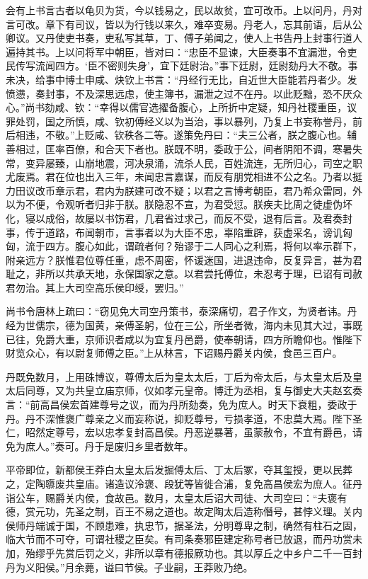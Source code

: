 \documentclass[12pt,UTF8]{ctexbook}
\begin{document}
会有上书言古者以龟贝为货，今以钱易之，民以故贫，宜可改币。上以问丹，丹对言可改。章下有司议，皆以为行钱以来久，难卒变易。丹老人，忘其前语，后从公卿议。又丹使吏书奏，吏私写其草，丁、傅子弟闻之，使人上书告丹上封事行道人遍持其书。上以问将军中朝臣，皆对曰：“忠臣不显谏，大臣奏事不宜漏泄，令吏民传写流闻四方。‘臣不密则失身’，宜下廷尉治。”事下廷尉，廷尉劾丹大不敬。事未决，给事中博士申咸、炔钦上书言：“丹经行无比，自近世大臣能若丹者少。发愤懑，奏封事，不及深思远虑，使主簿书，漏泄之过不在丹。以此贬黜，恐不厌众心。”尚书劾咸、钦：“幸得以儒官选擢备腹心，上所折中定疑，知丹社稷重臣，议罪处罚，国之所慎，咸、钦初傅经义以为当治，事以暴列，乃复上书妄称誉丹，前后相违，不敬。”上贬咸、钦秩各二等。遂策免丹曰：“夫三公者，朕之腹心也。辅善相过，匡率百僚，和合天下者也。朕既不明，委政于公，间者阴阳不调，寒暑失常，变异屡臻，山崩地震，河决泉涌，流杀人民，百姓流连，无所归心，司空之职尤废焉。君在位也出入三年，未闻忠言嘉谋，而反有朋党相进不公之名。乃者以挺力田议改币章示君，君内为朕建可改不疑；以君之言博考朝臣，君乃希众雷同，外以为不便，令观听者归非于朕。朕隐忍不宣，为君受愆。朕疾夫比周之徒虚伪坏化，寝以成俗，故屡以书饬君，几君省过求己，而反不受，退有后言。及君奏封事，传于道路，布闻朝市，言事者以为大臣不忠，辜陷重辟，获虚采名，谤讥匈匈，流于四方。腹心如此，谓疏者何？殆谬于二人同心之利焉，将何以率示群下，附亲远方？朕惟君位尊任重，虑不周密，怀谖迷国，进退违命，反复异言，甚为君耻之，非所以共承天地，永保国家之意。以君尝托傅位，未忍考于理，已诏有司赦君勿治。其上大司空高乐侯印绶，罢归。”



尚书令唐林上疏曰：“窃见免大司空丹策书，泰深痛切，君子作文，为贤者讳。丹经为世儒宗，德为国黄，亲傅圣躬，位在三公，所坐者微，海内未见其大过，事既已往，免爵大重，京师识者咸以为宜复丹邑爵，使奉朝请，四方所瞻仰也。惟陛下财览众心，有以尉复师傅之臣。”上从林言，下诏赐丹爵关内侯，食邑三百户。



丹既免数月，上用硃博议，尊傅太后为皇太太后，丁后为帝太后，与太皇太后及皇太后同尊，又为共皇立庙京师，仪如孝元皇帝。博迁为丞相，复与御史大夫赵玄奏言：“前高昌侯宏首建尊号之议，而为丹所劾奏，免为庶人。时天下衰粗，委政于丹。丹不深惟褒广尊亲之义而妄称说，抑贬尊号，亏损孝道，不忠莫大焉。陛下圣仁，昭然定尊号，宏以忠孝复封高昌侯。丹恶逆暴著，虽蒙赦令，不宜有爵邑，请免为庶人。”奏可。丹于是废归乡里者数年。



平帝即位，新都侯王莽白太皇太后发掘傅太后、丁太后冢，夺其玺授，更以民葬之，定陶隳废共皇庙。诸造议泠褒、段犹等皆徙合浦，复免高昌侯宏为庶人。征丹诣公车，赐爵关内侯，食故邑。数月，太皇太后诏大司徒、大司空曰：“夫褒有德，赏元功，先圣之制，百王不易之道也。故定陶太后造称僭号，甚悖义理。关内侯师丹端诚于国，不顾患难，执忠节，据圣法，分明尊卑之制，确然有柱石之固，临大节而不可夺，可谓社稷之臣矣。有司条奏邪臣建定称号者已放退，而丹功赏未加，殆缪乎先赏后罚之义，非所以章有德报厥功也。其以厚丘之中乡户二千一百封丹为义阳侯。”月余薨，谥曰节侯。子业嗣，王莽败乃绝。
\end{document}
